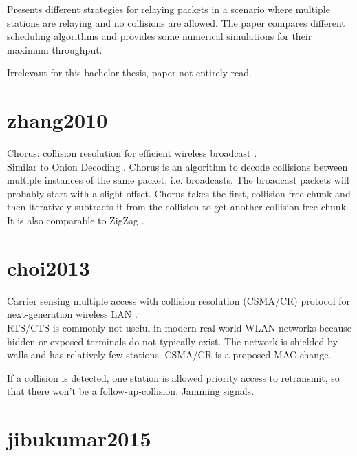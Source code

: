 Presents different strategies for relaying packets in a scenario where multiple stations are relaying and no collisions are allowed. The paper compares different scheduling algorithms and provides some numerical simulations for their maximum throughput.

Irrelevant for this bachelor thesis, paper not entirely read.



\section*{zhang2010}

Chorus: collision resolution for efficient wireless broadcast \cite{zhang2010}.\\

Similar to Onion Decoding \cite{wang2010}. Chorus is an algorithm to decode collisions between multiple instances of the same packet, i.e. broadcasts. The broadcast packets will probably start with a slight offset. Chorus takes the first, collision-free chunk and then iteratively subtracts it from the collision to get another collision-free chunk. It is also comparable to ZigZag \cite{gollakota2008}.



\section*{choi2013}

Carrier sensing multiple access with collision resolution (CSMA/CR) protocol for next-generation wireless LAN \cite{choi2013}.\\

RTS/CTS is commonly not useful in modern real-world WLAN networks because hidden or exposed terminals do not typically exist. The network is shielded by walls and has relatively few stations. CSMA/CR is a proposed MAC change.

If a collision is detected, one station is allowed priority access to retransmit, so that there won't be a follow-up-collision. Jamming signals.



\section*{jibukumar2015}

